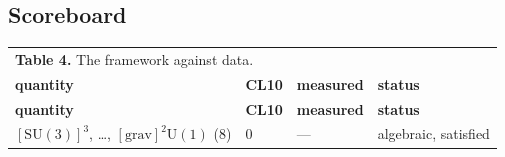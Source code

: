 \documentclass[aps,prd,amsmath,amssymb,superscriptaddress,longbibliography,floatfix,preprint]{revtex4-2}
\begin{document}
\subsection{Scoreboard}

{\footnotesize
\setlength{\tabcolsep}{4pt}
\renewcommand{\arraystretch}{1.45}

\begin{longtable}{llll}
\multicolumn{4}{l}{\textbf{Table 4.} The framework against data.} \\
\addlinespace[2pt]
\toprule
\parbox[c]{2.63cm}{\vspace{2.5pt}\raggedright {} \textbf{quantity}\vspace{2.5pt}} & \parbox[c]{4.21cm}{\vspace{2.5pt}\raggedright {} \textbf{CL10}\vspace{2.5pt}} & \parbox[c]{3.01cm}{\vspace{2.5pt}\raggedright {} \textbf{measured}\vspace{2.5pt}} & \parbox[c]{4.8cm}{\vspace{2.5pt}\raggedright {} \textbf{status}\vspace{2.5pt}} \\
\midrule
\endfirsthead
\toprule
\parbox[c]{2.63cm}{\vspace{2.5pt}\raggedright {} \textbf{quantity}\vspace{2.5pt}} & \parbox[c]{4.21cm}{\vspace{2.5pt}\raggedright {} \textbf{CL10}\vspace{2.5pt}} & \parbox[c]{3.01cm}{\vspace{2.5pt}\raggedright {} \textbf{measured}\vspace{2.5pt}} & \parbox[c]{4.8cm}{\vspace{2.5pt}\raggedright {} \textbf{status}\vspace{2.5pt}} \\
\midrule
\endhead
\midrule
\endfoot
\bottomrule
\endlastfoot
\parbox[c]{2.63cm}{\vspace{2.5pt}\raggedright {} \mbox{$[\mathrm{SU}(3)]^3$}, …, \mbox{$[\mathrm{grav}]^2\mathrm{U}(1)$} (8)\vspace{2.5pt}} & \parbox[c]{4.21cm}{\vspace{2.5pt}\raggedright {} \mbox{$0$}\vspace{2.5pt}} & \parbox[c]{3.01cm}{\vspace{2.5pt}\raggedright {} ---\vspace{2.5pt}} & \parbox[c]{4.8cm}{\vspace{2.5pt}\raggedright {} algebraic, satisfied\vspace{2.5pt}} \\

\end{longtable}}
\end{document}
